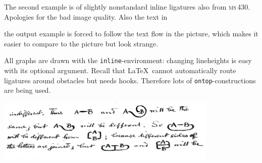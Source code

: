 \documentclass[a4paper,justified]{tufte-handout}
\begin{document}
The second example is of slightly nonstandard inline ligatures also from \textsc{ms}\,430. Apologies for the bad image quality. Also the text in\break
\begin{fullwidth}
\parbox{150pt}{\vspace*{-8pt}the output example is forced to follow the text flow in the picture, which makes it easier to compare to the picture but look strange.

\hspace*{1pc}All graphs are drawn with the \texttt{inline}-environment: changing lineheights is easy with its optional argument. Recall that \LaTeX\ cannot automatically route ligatures around obstacles but needs hooks. Therefore lots of \texttt{ontop}-constructions are being used.}%
\hfill\parbox{301pt}{\parbox{300pt}{\includegraphics[width=300pt]{doc-sources/F_lis_MS430.eps}}

}
\end{fullwidth}
\end{document}
